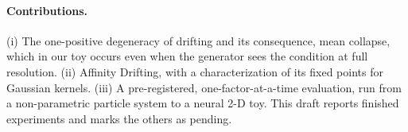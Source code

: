 \paragraph{Contributions.} (i) The one-positive degeneracy of drifting and its consequence, mean collapse, which in our toy
occurs even when the generator sees the condition at full resolution. (ii) Affinity Drifting, with a characterization of its fixed points for Gaussian kernels.
(iii) A pre-registered, one-factor-at-a-time evaluation, run from a non-parametric particle system to a neural 2-D
toy. This draft reports finished experiments and marks the others as pending.
